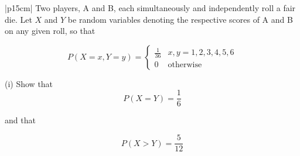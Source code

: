 \documentclass[a4paper,12pt]{article}
\begin{document}
\begin{table}[ht!]
     \centering
     \begin{tabular}{|p{15cm}|}
     \hline        
\large
Two players, A and B, each simultaneously and independently roll a fair die.  
Let $X$ and $Y$ be random variables denoting the respective scores of A and B on any given roll, so that 

\[   P(X=x,Y=y) = \begin{cases}  \frac{1}{36} & x,y= 1,2,3,4,5,6 \\
0 & \mbox{otherwise} \end{cases}\]

 
 
 
(i) Show that 
\[P(X=Y) = \frac{1}{6}\]
 
 
and that 
 
\[P(X>Y) = \frac{5}{12}\]
 
 \\ \hline
      \end{tabular}
    \end{table}
\end{document}
